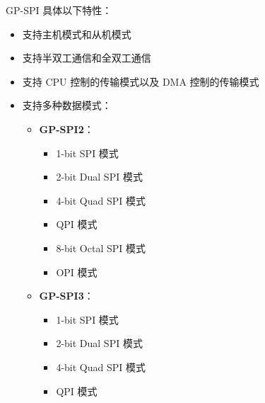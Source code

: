 \documentclass[main\_\_CN.tex]{subfiles}
\begin{document}
GP-SPI 具体以下特性：
\begin{itemize}
    \item 支持主机模式和从机模式
    \item 支持半双工通信和全双工通信
    \item 支持 CPU 控制的传输模式以及 DMA 控制的传输模式
    \item 支持多种数据模式：
        \begin{itemize}
            \item \textbf{GP-SPI2}：
            \begin{itemize}
                \item 1-bit SPI 模式
                \item 2-bit Dual SPI 模式
                \item 4-bit Quad SPI 模式
                \item QPI 模式
                \item 8-bit Octal SPI 模式
                \item OPI 模式
        \end{itemize}
            \item \textbf{GP-SPI3}：
            \begin{itemize}
                \item 1-bit SPI 模式
                \item 2-bit Dual SPI 模式
                \item 4-bit Quad SPI 模式
                \item QPI 模式
        \end{itemize}
        \end{itemize}


\end{itemize}
\end{document}
